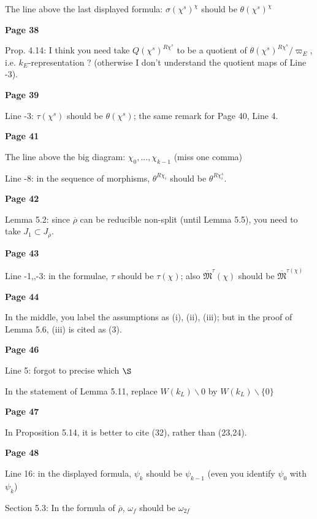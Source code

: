 \documentclass{amsart}
\theoremstyle{definition}
\newcommand{\vv}{\vspace{2mm}}
\begin{document}
The line above the last displayed formula: $\sigma(\chi^s)^{\chi}$ should be $\theta(\chi^s)^{\chi}$ 

\vv

 \noindent\textbf{Page 38}
 
Prop. 4.14: I think you need take $Q(\chi^s)^{R\chi^s}$ to be a quotient of $\theta(\chi^s)^{R\chi^s}/\varpi_E$, i.e. $k_E$-representation ?   (otherwise I don't understand the quotient maps of Line -3).

\vv
 \noindent\textbf{Page 39}
 
 Line -3: $\tau(\chi^s)$ should be $\theta(\chi^s)$; the same remark for Page 40, Line 4.

\vv
 \noindent\textbf{Page 41}
 
The line above the big diagram: $\chi_0,..., \chi_{k-1}$ (miss one comma)

Line -8: in the sequence of morphisms, $\theta^{R\chi_i}$ should be $\theta^{R\chi_i^s}$.

\vv
 \noindent\textbf{Page 42}

Lemma 5.2: since $\overline{\rho}$ can be reducible non-split (until Lemma 5.5), you need to take $J_1\subset J_{\overline{\rho}}$.

\vv
\noindent\textbf{Page 43}

Line -1,,-3: in the formulae, $\tau$ should be $\tau(\chi)$; also $\overline{\mathfrak{M}}^{\tau}(\chi)$ should be $\overline{\mathfrak{M}}^{\tau(\chi)}$

 
\vv

\noindent\textbf{Page 44}

In the middle, you label the assumptions as (i), (ii), (iii); but in the proof of Lemma 5.6, (iii) is cited as (3). 

\vv
\noindent\textbf{Page 46}

Line 5: forgot to precise which $\S$

In the statement of Lemma 5.11, replace $W(k_L)\backslash 0$ by $W(k_L)\backslash\{0\}$

 \vv   
 \noindent\textbf{Page 47}
 
In Proposition 5.14, it is better to cite (32), rather than (23,24).
    \vv
 
 \noindent\textbf{Page 48}

Line 16: in the displayed formula, $\psi_k$ should be $\psi_{k-1}$ (even you identify $\psi_0$ with $\psi_k$)

Section 5.3: In the formula  of $\overline{\rho}$, $\omega_f$ should be $\omega_{2f}$   
\end{document}
